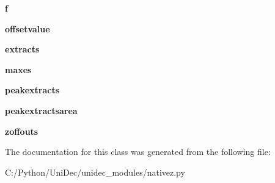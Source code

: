 \begin{DoxyCompactItemize}
\item 
\hypertarget{class_uni_dec_1_1unidec__modules_1_1nativez_1_1_native_z_ab55313c8a773c531db9ce9b776c59cc4}{}{\bfseries f}\label{class_uni_dec_1_1unidec__modules_1_1nativez_1_1_native_z_ab55313c8a773c531db9ce9b776c59cc4}

\item 
\hypertarget{class_uni_dec_1_1unidec__modules_1_1nativez_1_1_native_z_ad3d802f01961ac116c5fd04018e97aa8}{}{\bfseries offsetvalue}\label{class_uni_dec_1_1unidec__modules_1_1nativez_1_1_native_z_ad3d802f01961ac116c5fd04018e97aa8}

\item 
\hypertarget{class_uni_dec_1_1unidec__modules_1_1nativez_1_1_native_z_aa7a9777e3bc759e41f83d55b57eef78c}{}{\bfseries extracts}\label{class_uni_dec_1_1unidec__modules_1_1nativez_1_1_native_z_aa7a9777e3bc759e41f83d55b57eef78c}

\item 
\hypertarget{class_uni_dec_1_1unidec__modules_1_1nativez_1_1_native_z_acc1080af87f7dfd217fcec0706f839a1}{}{\bfseries maxes}\label{class_uni_dec_1_1unidec__modules_1_1nativez_1_1_native_z_acc1080af87f7dfd217fcec0706f839a1}

\item 
\hypertarget{class_uni_dec_1_1unidec__modules_1_1nativez_1_1_native_z_a36e386e96eca9338f69e4563a0c6b0c2}{}{\bfseries peakextracts}\label{class_uni_dec_1_1unidec__modules_1_1nativez_1_1_native_z_a36e386e96eca9338f69e4563a0c6b0c2}

\item 
\hypertarget{class_uni_dec_1_1unidec__modules_1_1nativez_1_1_native_z_ad47ed7b7b0c73cac3d6568344aa8ae17}{}{\bfseries peakextractsarea}\label{class_uni_dec_1_1unidec__modules_1_1nativez_1_1_native_z_ad47ed7b7b0c73cac3d6568344aa8ae17}

\item 
\hypertarget{class_uni_dec_1_1unidec__modules_1_1nativez_1_1_native_z_ac3e29eaed3e56251e5c9644ee2842655}{}{\bfseries zoffouts}\label{class_uni_dec_1_1unidec__modules_1_1nativez_1_1_native_z_ac3e29eaed3e56251e5c9644ee2842655}

\end{DoxyCompactItemize}


The documentation for this class was generated from the following file\+:\begin{DoxyCompactItemize}
\item 
C\+:/\+Python/\+Uni\+Dec/unidec\+\_\+modules/nativez.\+py\end{DoxyCompactItemize}
